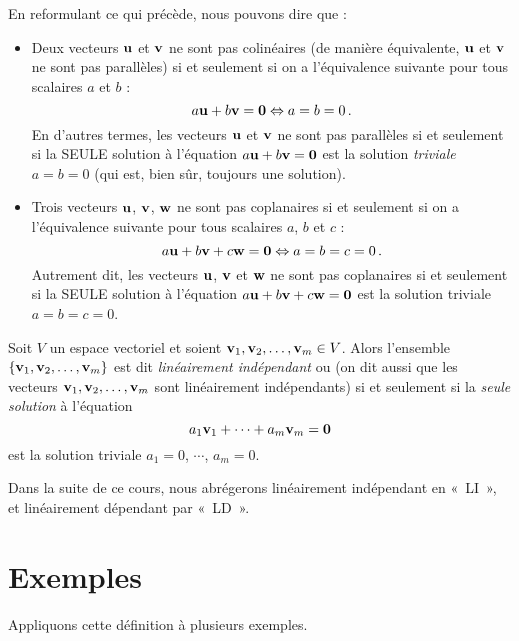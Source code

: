 En reformulant ce qui précède, nous pouvons dire que :
\begin{itemize}
\item Deux vecteurs $\mathbf{u}$ et $\mathbf{v}$ ne sont pas colinéaires (de manière équivalente, 
$\mathbf{u}$ et $\mathbf{v}$ ne sont pas parallèles) si et seulement si on a l'équivalence suivante pour tous scalaires $a$ et $b$ :
$$
a\mathbf{u} + b\mathbf{v} = \mathbf{0} \Leftrightarrow a=b=0\,.
$$
En d'autres termes, les vecteurs $\mathbf{u}$ et $\mathbf{v}$ ne sont pas parallèles si et seulement si la SEULE solution à
l'équation $a\mathbf{u} + b\mathbf{v} = \mathbf{0}$ est la solution \emph{triviale}
$a=b=0$ (qui est, bien sûr, toujours une solution).

\item Trois vecteurs $\mathbf{u}$, $\mathbf{v}$, $\mathbf{w}$ ne sont pas coplanaires si et seulement si on a l'équivalence suivante pour tous scalaires $a$, $b$ et $c$ :
$$
a\mathbf{u} + b\mathbf{v} + c\mathbf{w} = \mathbf{0} \Leftrightarrow a=b=c=0\,.
$$
Autrement dit,  les vecteurs $\mathbf{u}$, $\mathbf{v}$ et $\mathbf{w}$ ne sont pas coplanaires si et seulement si la SEULE solution à
l'équation $a\mathbf{u} + b\mathbf{v} + c\mathbf{w} = \mathbf{0}$ est la solution triviale $a=b=c=0$.
\end{itemize}

\begin{definition}  Soit $V$ un espace vectoriel et soient
$\mathbf{v}_1, \mathbf{v}_2, \ldots, \mathbf{v}_m \in V$.  Alors l'ensemble \\
$\{\mathbf{v}_1, \mathbf{v}_2, \ldots, \mathbf{v}_m\}$ est dit \emph{linéairement indépendant} ou 
(on dit aussi que les vecteurs $\mathbf{v}_1, \mathbf{v}_2, \ldots, \mathbf{v}_m$ sont linéairement indépendants)
si et seulement si la \emph{seule solution} à l'équation
$$
a_1\mathbf{v}_1 + \cdots + a_m\mathbf{v}_m = \mathbf{0}
$$
est la solution triviale $a_1=0$, $\cdots$, $a_m=0$.
\end{definition}


Dans la suite de ce cours, nous abrégerons linéairement indépendant en «~LI~», et linéairement dépendant par «~LD~».

\section{Exemples}

Appliquons cette définition à plusieurs exemples.

